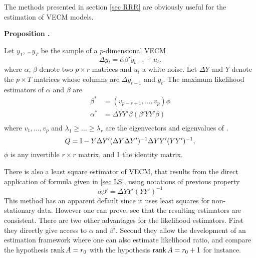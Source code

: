 \documentclass[12pt, leqno]{article}
\newcommand{\id}{\text{\rm I}}
\newcommand{\rk}{\text{\rm rank}\,}
\newcounter{prop}
\renewcommand{\theprop}{\arabic{prop}}
\newenvironment{prop}[0]%
{\refstepcounter{prop}\vspace{10pt}\par\noindent 
{\bf Proposition \theprop.}
\begin{itshape}}%
{\end{itshape}\par\vspace{0.2cm}}
\newcounter{ex}
\begin{document}
The methods presented in section \ref{sec RRR} are obviously useful 
for the estimation of VECM models.
\begin{prop}
Let $y_1$, \ldots $y_T$ be the sample of a $p$-dimensional VECM
$$
\Delta y_t = \alpha \beta ' y_{t-1} + u_t.
$$
where $\alpha$, $\beta$ denote two $p \times r$ matrices and $u_t$ a white noise.
Let $\Delta Y$ and $Y$ denote the $p\times T$ matrices whose columns are 
$\Delta y_{t-1}$ and $y_t$. The maximum likelihood estimators of $\alpha$ 
and $\beta$ are
\begin{align*}
\beta^* & = \left( v_{p-r+1},\ldots,v_p \right) \phi \\[0.2cm]
\alpha^* & = \Delta Y Y' \beta \left( \beta' Y Y' \beta \right) \\
\end{align*}
where $v_1,\ldots, v_p$ and $\lambda_1 \geq \ldots \geq \lambda_r$ are
the eigenvectors and eigenvalues of .
$$
Q = \id - Y \Delta Y' (\Delta Y \Delta Y')^{-1} \Delta Y Y' (Y Y')^{-1},
$$
$\phi$ is any invertible $r\times r$ matrix, and $\id$ the identity matrix.
\end{prop}

There is also a least square estimator of VECM, that results from the direct application 
of formula given in \ref{sec LS}, using notations of previous property
$$
\alpha \beta' = \Delta Y Y' (Y Y')^{-1}
$$
This method has an apparent default since it uses least squares for non-stationary data. 
However one can prove, see \cite{Lutkepohl} that the resulting estimators are consistent.
There are two other advantages for the likelihood estimators. First they directly
give access to $\alpha$ and $\beta'$. Second they allow the development of an estimation
framework where one can also estimate likelihood ratio, and compare the hypothesis
$\rk A = r_0$ with the hypothesis $\rk A = r_0+1$ for instance. 



\nocite{*}


\end{document}
